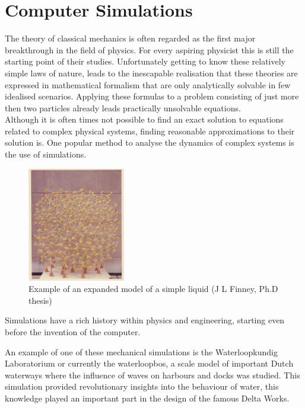 \newpage
\section{Computer Simulations}

The theory of classical mechanics is often regarded as the first major breakthrough in
the field of physics. For every aspiring physicist this is still the starting point of
their studies. Unfortunately getting to know these relatively simple laws of nature,
leads to the inescapable realisation that these theories are expressed in mathematical
formalism that are only analytically solvable in few idealised scenarios. Applying these
formulas to a problem consisting of just more then two particles already leads
practically unsolvable equations.\\

Although it is often times not possible to find an exact solution to equations
related to complex physical systems, finding reasonable approximations to their solution
is. One popular method to analyse the dynamics of complex systems is the use of
simulations.\\

\begin{figure}
  \begin{center}
    \includegraphics[width=0.38\textwidth]{Figures/WaterModel.png}
  \end{center}
  \caption{Example of an expanded model of a simple liquid (J L Finney, Ph.D thesis)}
\end{figure}

Simulations have a rich history within physics and engineering, starting even before the
invention of the computer.

An example of one of these mechanical simulations is the Waterloopkundig Laboratorium or
currently the waterloopbos, a scale model of important
Dutch waterways where the influence of waves on harbours and docks was studied. This
simulation provided revolutionary insights into the behaviour of water, this knowledge
played an important part in the design of the famous Delta Works.\\

